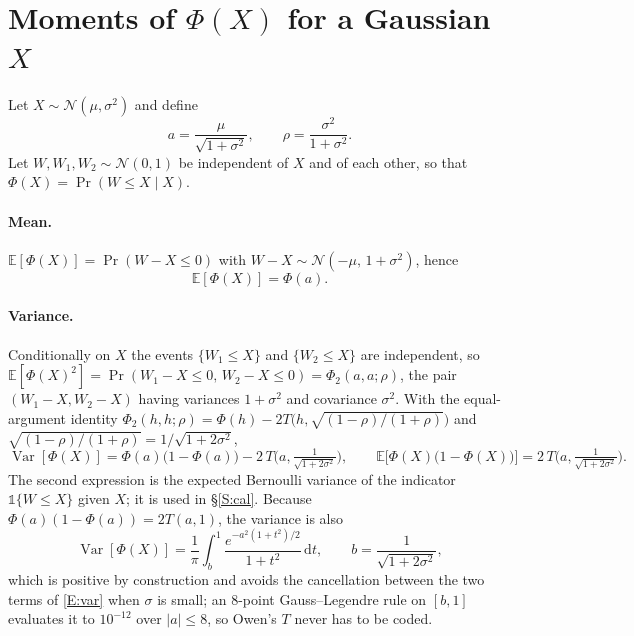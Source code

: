 \documentclass[letterpaper]{article}
\begin{document}
\section{Moments of $\Phi(X)$ for a Gaussian $X$}\label{S:Phi}
Let $X\sim\mathcal N(\mu,\sigma^2)$ and define
\begin{equation}
a=\frac{\mu}{\sqrt{1+\sigma^2}},\qquad \rho=\frac{\sigma^2}{1+\sigma^2}.
\end{equation}
Let $W,W_1,W_2\sim\mathcal N(0,1)$ be independent of $X$ and of each other, so that $\Phi(X)=\Pr(W\le X\mid X)$.

\paragraph{Mean.} $\mathbb E[\Phi(X)]=\Pr(W-X\le0)$ with $W-X\sim\mathcal N(-\mu,\,1+\sigma^2)$, hence
\begin{equation}
\mathbb E[\Phi(X)]=\Phi(a).
\label{E:mean}
\end{equation}

\paragraph{Variance.} Conditionally on $X$ the events $\{W_1\le X\}$ and $\{W_2\le X\}$ are independent, so $\mathbb E[\Phi(X)^2]=\Pr(W_1-X\le0,\,W_2-X\le0)=\Phi_2(a,a;\rho)$, the pair $(W_1-X,W_2-X)$ having variances $1+\sigma^2$ and covariance $\sigma^2$. With the equal-argument identity $\Phi_2(h,h;\rho)=\Phi(h)-2T\big(h,\sqrt{(1-\rho)/(1+\rho)}\big)$ and $\sqrt{(1-\rho)/(1+\rho)}=1/\sqrt{1+2\sigma^2}$,
\begin{equation}
\operatorname{Var}[\Phi(X)]=\Phi(a)\big(1-\Phi(a)\big)-2\,T\!\Big(a,\tfrac{1}{\sqrt{1+2\sigma^2}}\Big),
\qquad
\mathbb E\big[\Phi(X)\big(1-\Phi(X)\big)\big]=2\,T\!\Big(a,\tfrac{1}{\sqrt{1+2\sigma^2}}\Big).
\label{E:var}
\end{equation}
The second expression is the expected Bernoulli variance of the indicator $\mathbb 1\{W\le X\}$ given $X$; it is used in \S\ref{S:cal}. Because $\Phi(a)(1-\Phi(a))=2T(a,1)$, the variance is also
\begin{equation}
\operatorname{Var}[\Phi(X)]=\frac{1}{\pi}\int_{b}^{1}\frac{e^{-a^2(1+t^2)/2}}{1+t^2}\,\mathrm dt,\qquad b=\frac{1}{\sqrt{1+2\sigma^2}},
\label{E:varint}
\end{equation}
which is positive by construction and avoids the cancellation between the two terms of \eqref{E:var} when $\sigma$ is small; an 8-point Gauss--Legendre rule on $[b,1]$ evaluates it to $10^{-12}$ over $|a|\le8$, so Owen's $T$ never has to be coded.
\end{document}
